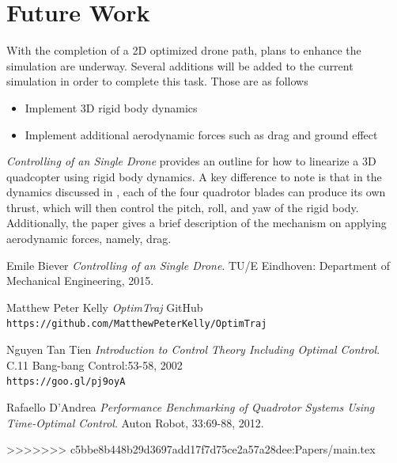 \documentclass[12pt]{article}
\begin{document}
\clearpage
\section{Future Work}
With the completion of a 2D optimized drone path, plans to enhance the simulation are underway. Several additions will be added to the current simulation in order to complete this task. Those are as follows 
\newline
\begin{itemize}
  \item Implement 3D rigid body dynamics
  \item Implement additional aerodynamic forces such as drag and ground effect
\end{itemize}
\textit{Controlling of an Single Drone}\cite{Controlling of an Single Drone} provides an outline for how to linearize a 3D quadcopter using rigid body dynamics. A key difference to note is that in the dynamics discussed in \cite{Controlling of an Single Drone}, each of the four quadrotor blades can produce its own thrust, which will then control the pitch, roll, and yaw of the rigid body. Additionally, the paper gives a brief description of the mechanism on applying aerodynamic forces, namely, drag.


\clearpage



\begin{thebibliography}{9}


Emile Biever
\textit{Controlling of an Single Drone}.
TU/E Eindhoven: Department of Mechanical Engineering, 2015.



Matthew Peter Kelly
\textit{OptimTraj}
GitHub
\\\texttt{https://github.com/MatthewPeterKelly/OptimTraj}


Nguyen Tan Tien
\textit{Introduction to Control Theory Including Optimal Control}.
C.11 Bang-bang Control:53-58, 2002
\\\texttt{https://goo.gl/pj9oyA}



Rafaello D'Andrea
\textit{Performance Benchmarking of Quadrotor Systems Using Time-Optimal Control}.
Auton Robot, 33:69-88, 2012.















\end{thebibliography}


>>>>>>> c5bbe8b448b29d3697add17f7d75ce2a57a28dee:Papers/main.tex
\end{document}
